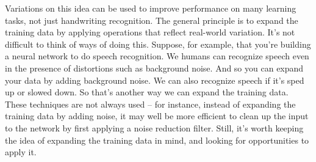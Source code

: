 \documentclass[a4paper,twoside,10pt]{book}
\begin{document}
Variations on this idea can be used to improve performance on many learning tasks, not just handwriting recognition. The general principle is to expand the training data by applying operations that reflect real-world variation. It's not difficult to think of ways of doing this. Suppose, for example, that you're building a neural network to do speech recognition. We humans can recognize speech even in the presence of distortions such as background noise. And so you can expand your data by adding background noise. We can also recognize speech if it's sped up or slowed down. So that's another way we can expand the training data. These techniques are not always used -- for instance, instead of expanding the training data by adding noise, it may well be more efficient to clean up the input to the network by first applying a noise reduction filter. Still, it's worth keeping the idea of expanding the training data in mind, and looking for opportunities to apply it.
\end{document}
